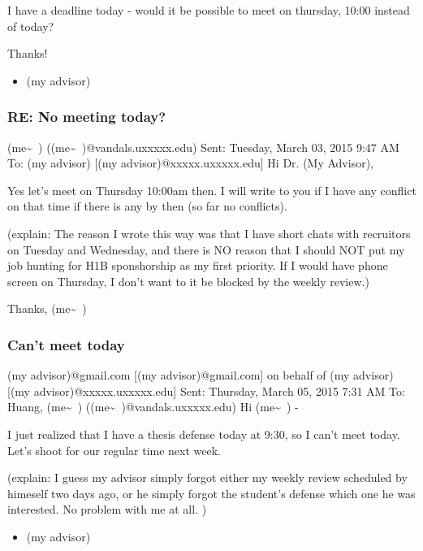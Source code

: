 \documentclass[9pt,b5paper]{article}
\begin{document}
I have a deadline today - would it be possible to meet on thursday, 10:00 instead of today?

Thanks!

\begin{itemize}
\item (my advisor)
\end{itemize}
\subsubsection{RE: No meeting today?}
\label{sec-3-3-2}
(me\textasciitilde{}~) ((me\textasciitilde{}~)@vandals.uxxxxx.edu)
Sent:        Tuesday, March 03, 2015 9:47 AM
To:        
(my advisor) [(my advisor)@xxxxx.uxxxxx.edu]
Hi Dr. (My Advisor), 

Yes let's meet on Thursday 10:00am then. I will write to you if I have any conflict on that time if there is any by then (so far no conflicts). 

(explain: The reason I wrote this way was that I have short chats with recruitors on Tuesday and Wednesday, and there is NO reason that I should NOT put my job hunting for H1B sponshorship as my first priority. If I would have phone screen on Thursday, I don't want to it be blocked by the weekly review.)

Thanks,
(me\textasciitilde{}~)
\subsubsection{Can't meet today}
\label{sec-3-3-3}
(my advisor)@gmail.com [(my advisor)@gmail.com] on behalf of (my advisor) [(my advisor)@xxxxx.uxxxxx.edu]
Sent:        Thursday, March 05, 2015 7:31 AM
To:        
Huang, (me\textasciitilde{}~) ((me\textasciitilde{}~)@vandals.uxxxxx.edu)
Hi (me\textasciitilde{}~) - 

I just realized that I have a thesis defense today at 9:30, so I can't meet today. Let's shoot for our regular time next week.

(explain: I guess my advisor simply forgot either my weekly review scheduled by himeself two days ago, or he simply forgot the student's defense which one he was interested. No problem with me at all. )

\begin{itemize}
\item (my advisor)
\end{itemize}
\end{document}
